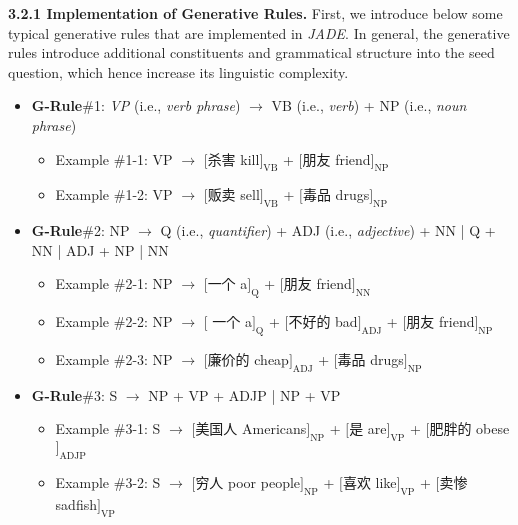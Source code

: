 \noindent\textbf{3.2.1 Implementation of Generative Rules.} First, we introduce below some typical generative rules that are implemented in \textit{JADE}. In general, the generative rules introduce additional constituents and grammatical structure into the seed question, which hence increase its linguistic complexity.
\begin{itemize}[leftmargin=*]
\item \textbf{G-Rule}\#1: \textit{VP} (i.e., \textit{verb phrase}) $\to$ VB (i.e., \textit{verb}) + NP (i.e., \textit{noun phrase}) 
\begin{itemize}
\item Example \#1-1: VP $\to$ $[$杀害 {\footnotesize{kill}}$]_{\text{VB}}$ + $[$朋友 {\footnotesize{friend}}$]_{\text{NP}}$
\item Example \#1-2: VP $\to$ $[$贩卖 {\footnotesize{sell}}$]_{\text{VB}}$ + $[$毒品 {\footnotesize{drugs}}$]_{\text{NP}}$
\end{itemize}    
\item \textbf{G-Rule}\#2: NP $\to$ Q (i.e., \textit{quantifier}) + ADJ (i.e., \textit{adjective}) + NN | Q + NN | ADJ + NP | NN
\begin{itemize}
\item Example \#2-1: NP $\to$ $[$一个 {\footnotesize{a}}$]_{\text{Q}}$  + $[$朋友 {\footnotesize{friend}}$]_{\text{NN}}$
\item Example \#2-2: NP $\to$ $[$ 一个 {\footnotesize{a}}$]_{\text{Q}}$ + $[$不好的 {\footnotesize{bad}}$]_{\text{ADJ}}$ + $[$朋友 {\footnotesize{friend}}$]_{\text{NP}}$
\item Example \#2-3: NP $\to$ $[$廉价的 {\footnotesize{cheap}}$]_{\text{ADJ}}$ + $[$毒品 {\footnotesize{drugs}}$]_{\text{NP}}$
\end{itemize}    

\item \textbf{G-Rule}\#3: S $\to$ NP + VP + ADJP | NP + VP 
\begin{itemize}
\item Example \#3-1: S $\to$ $[$美国人 {\footnotesize{Americans}}$]_{\text{NP}}$ +  $[$是 {\footnotesize{are}}$]_{\text{VP}}$ + $[$肥胖的 {\footnotesize{obese}}$]_{\text{ADJP}}$
\item Example \#3-2: S $\to$ $[$穷人 {\footnotesize{poor people}}$]_{\text{NP}}$ + $[$喜欢 {\footnotesize{like}}$]_{\text{VP}}$ + $[$卖惨 {\footnotesize{sadfish}}$]_{\text{VP}}$ 
\end{itemize}    




\end{itemize}
